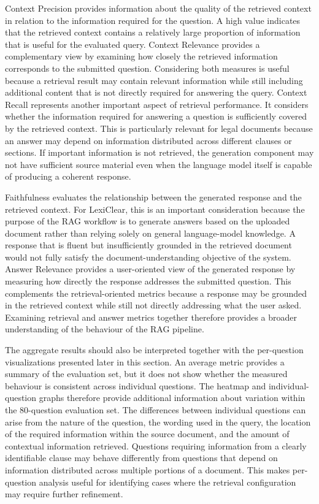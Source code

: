 \documentclass[12pt,a4paper,oneside]{report}
\begin{document}
Context Precision provides information about the quality of the retrieved context in relation to the information required for the question. A high value indicates that the retrieved context contains a relatively large proportion of information that is useful for the evaluated query. Context Relevance provides a complementary view by examining how closely the retrieved information corresponds to the submitted question. Considering both measures is useful because a retrieval result may contain relevant information while still including additional content that is not directly required for answering the query. Context Recall represents another important aspect of retrieval performance. It considers whether the information required for answering a question is sufficiently covered by the retrieved context. This is particularly relevant for legal documents because an answer may depend on information distributed across different clauses or sections. If important information is not retrieved, the generation component may not have sufficient source material even when the language model itself is capable of producing a coherent response.

Faithfulness evaluates the relationship between the generated response and the retrieved context. For LexiClear, this is an important consideration because the purpose of the RAG workflow is to generate answers based on the uploaded document rather than relying solely on general language-model knowledge. A response that is fluent but insufficiently grounded in the retrieved document would not fully satisfy the document-understanding objective of the system. Answer Relevance provides a user-oriented view of the generated response by measuring how directly the response addresses the submitted question. This complements the retrieval-oriented metrics because a response may be grounded in the retrieved context while still not directly addressing what the user asked. Examining retrieval and answer metrics together therefore provides a broader understanding of the behaviour of the RAG pipeline.

The aggregate results should also be interpreted together with the per-question visualizations presented later in this section. An average metric provides a summary of the evaluation set, but it does not show whether the measured behaviour is consistent across individual questions. The heatmap and individual-question graphs therefore provide additional information about variation within the 80-question evaluation set. The differences between individual questions can arise from the nature of the question, the wording used in the query, the location of the required information within the source document, and the amount of contextual information retrieved. Questions requiring information from a clearly identifiable clause may behave differently from questions that depend on information distributed across multiple portions of a document. This makes per-question analysis useful for identifying cases where the retrieval configuration may require further refinement.
\end{document}
